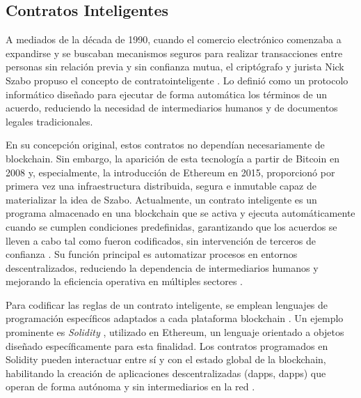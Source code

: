 \subsection{Contratos Inteligentes}
\label{sec:smart-contracts}

A mediados de la década de 1990, cuando el comercio electrónico comenzaba a expandirse y se buscaban mecanismos seguros para realizar transacciones entre personas sin relación previa y sin confianza mutua, el criptógrafo y jurista Nick Szabo propuso el concepto de \gls{contratointeligente} \cite{buterin2013ethereum}. Lo definió como un protocolo informático diseñado para ejecutar de forma automática los términos de un acuerdo, reduciendo la necesidad de intermediarios humanos y de documentos legales tradicionales.

En su concepción original, estos contratos no dependían necesariamente de blockchain. Sin embargo, la aparición de esta tecnología a partir de Bitcoin en 2008 y, especialmente, la introducción de Ethereum en 2015, proporcionó por primera vez una infraestructura distribuida, segura e inmutable capaz de materializar la idea de Szabo. Actualmente, un contrato inteligente es un programa almacenado en una blockchain que se activa y ejecuta automáticamente cuando se cumplen condiciones predefinidas, garantizando que los acuerdos se lleven a cabo tal como fueron codificados, sin intervención de terceros de confianza \cite{bulkowska2023implementation}. Su función principal es automatizar procesos en entornos descentralizados, reduciendo la dependencia de intermediarios humanos \cite{verma2023overview} y mejorando la eficiencia operativa en múltiples sectores \cite{sunny2022systematic}.

Para codificar las reglas de un contrato inteligente, se emplean lenguajes de programación específicos adaptados a cada plataforma blockchain \cite{bartolomeo2020introduccion}. Un ejemplo prominente es \textit{Solidity} \cite{taherdoost2023smart}, utilizado en Ethereum, un lenguaje orientado a objetos diseñado específicamente para esta finalidad. Los contratos programados en Solidity pueden interactuar entre sí y con el estado global de la blockchain, habilitando la creación de aplicaciones descentralizadas (\acrshort{dapps}, \acrlong{dapps}) que operan de forma autónoma y sin intermediarios en la red \cite{buterin2013ethereum}.

